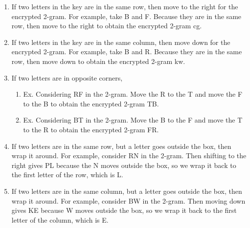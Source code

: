 \documentclass[11pt]{article}
\theoremstyle{definition}\newtheorem{definition}{Definition}
\theoremstyle{definition}\newtheorem{example}{Example}
\theoremstyle{definition}\newtheorem{samplecode}{Sample Code}
\begin{document}
\begin{enumerate}
    \item If two letters in the key are in the same row, then move to the right for the encrypted 2-gram. For example, take B and F. Because they are in the same row, then move to the right to obtain the encrypted 2-gram cg.
    \item If two letters in the key are in the same column, then move down for the encrypted 2-gram. For example, take B and R. Because they are in the same row, then move down to obtain the encrypted 2-gram kw. 
    \item If two letters are in opposite corners,
    \begin{enumerate}
        \item Ex. Considering RF in the 2-gram. Move the R to the T and move the F to the B to obtain the encrypted 2-gram TB.
        \item Ex. Considering BT in the 2-gram. Move the B to the F and move the T to the R to obtain the encrypted 2-gram FR.
    \end{enumerate}
    \item If two letters are in the same row, but a letter goes outside the box, then wrap it around. For example, consider RN in the 2-gram. Then shifting to the right gives PL because the N moves outside the box, so we wrap it back to the first letter of the row, which is L.
    \item If two letters are in the same column, but a letter goes outside the box, then wrap it around. For example, consider BW in the 2-gram. Then moving down gives KE because W moves outside the box, so we wrap it back to the first letter of the column, which is E.
\end{enumerate}
\end{document}
